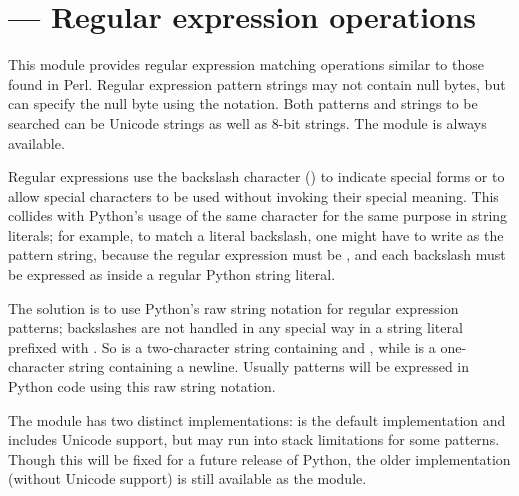 \section{ ---
         Regular expression operations}




This module provides regular expression matching operations similar to
those found in Perl.  Regular expression pattern strings may not
contain null bytes, but can specify the null byte using the
 notation.  Both patterns and strings to be
searched can be Unicode strings as well as 8-bit strings.  The
 module is always available.

Regular expressions use the backslash character (\character{\e}) to
indicate special forms or to allow special characters to be used
without invoking their special meaning.  This collides with Python's
usage of the same character for the same purpose in string literals;
for example, to match a literal backslash, one might have to write
 as the pattern string, because the regular expression
must be \samp{\e\e}, and each backslash must be expressed as
\samp{\e\e} inside a regular Python string literal.

The solution is to use Python's raw string notation for regular
expression patterns; backslashes are not handled in any special way in
a string literal prefixed with .  So  is a
two-character string containing \character{\e} and ,
while  is a one-character string containing a newline.
Usually patterns will be expressed in Python code using this raw
string notation.

The  module has two distinct
implementations:  is the default implementation and
includes Unicode support, but may run into stack limitations for some
patterns.  Though this will be fixed for a future release of Python,
the older implementation (without Unicode support) is still available
as the  module.


\begin{seealso}
\end{seealso}


